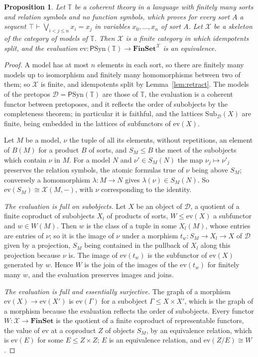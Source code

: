 \documentclass[11pt]{amsart}
\newtheorem{prop}[thm]{Proposition}
\theoremstyle{definition}
\newcommand{\Fin}{\mathbf{FinSet}}
\newcommand{\Sub}{\mathrm{Sub}}
\newcommand{\Syn}{\mathrm{Syn}}
\newcommand{\PP}{\mathsf P}
\newcommand{\cX}{\mathcal X}
\newcommand{\cD}{\mathcal D}
\newcommand{\bT}{\mathbb T}
\begin{document}
\begin{prop}\label{prop:finite}
Let $\bT$ be a coherent theory in a language with finitely many sorts
and relation symbols and no function symbols, which proves for every
sort $A$ a sequent $\top\vdash\bigvee_{i<j\le n}x_i=x_j$ in variables
$x_0,\dots,x_n$ of sort $A$. Let $\cX$ be a skeleton of the category of
models of $\bT$. Then $\cX$ is a finite category in which idempotents
split, and the evaluation $\mathrm{ev}\colon\PP\Syn(\bT)\to\Fin^{\cX}$
is an equivalence.
\end{prop}
\begin{proof}
A model has at most $n$ elements in each sort, so there are finitely
many models up to isomorphism and finitely many homomorphisms between
two of them; so $\cX$ is finite, and
idempotents split by Lemma~\ref{lem:retract}. The models of the
pretopos $\cD=\PP\Syn(\bT)$ are those of $\bT$, the evaluation is a
coherent functor between pretoposes, and it reflects the order of
subobjects by the completeness theorem; in particular it is faithful,
and the lattices $\Sub_\cD(X)$ are finite, being embedded in the
lattices of subfunctors of $\mathrm{ev}(X)$.

Let $M$ be a model, $\nu$ the tuple of all its elements, without
repetitions, an element of $B(M)$ for a product $B$ of sorts, and
$S_M\le B$ the meet of the subobjects which contain $\nu$ in $M$. For
a model $N$ and $\nu'\in S_M(N)$ the map $\nu_j\mapsto\nu'_j$ preserves
the relation symbols, the atomic formulas true of $\nu$ being above
$S_M$; conversely a homomorphism $\lambda\colon M\to N$ gives
$\lambda(\nu)\in S_M(N)$. So $\mathrm{ev}(S_M)\cong\cX(M,-)$, with
$\nu$ corresponding to the identity.

\emph{The evaluation is full on subobjects.} Let $X$ be an object of
$\cD$, a quotient of a finite coproduct of subobjects $X_l$ of
products of sorts, $W\le\mathrm{ev}(X)$ a subfunctor and $w\in W(M)$.
Then $w$ is the class of a tuple in some $X_l(M)$, whose entries are
entries of $\nu$; so it is the image of $\nu$ under a morphism $t_w
\colon S_M\to X_l\to X$ of $\cD$ given by a projection, $S_M$ being
contained in the pullback of $X_l$ along this projection because
$\nu$ is. The image of $\mathrm{ev}(t_w)$ is the subfunctor of
$\mathrm{ev}(X)$ generated by $w$. Hence $W$ is the join of the images
of the $\mathrm{ev}(t_w)$ for finitely many $w$, and the evaluation
preserves images and joins.

\emph{The evaluation is full and essentially surjective.} The graph of
a morphism $\mathrm{ev}(X)\to\mathrm{ev}(X')$ is $\mathrm{ev}(\Gamma)$
for a subobject $\Gamma\le X\times X'$, which is the graph of a
morphism because the evaluation reflects the order of subobjects.
Every functor $W\colon\cX\to\Fin$ is the quotient of a finite
coproduct of representable functors, the value of $\mathrm{ev}$ at a
coproduct $Z$ of objects $S_M$, by an equivalence relation, which is
$\mathrm{ev}(E)$ for some $E\le Z\times Z$; $E$ is an equivalence
relation, and $\mathrm{ev}(Z/E)\cong W$.
\end{proof}
\end{document}
